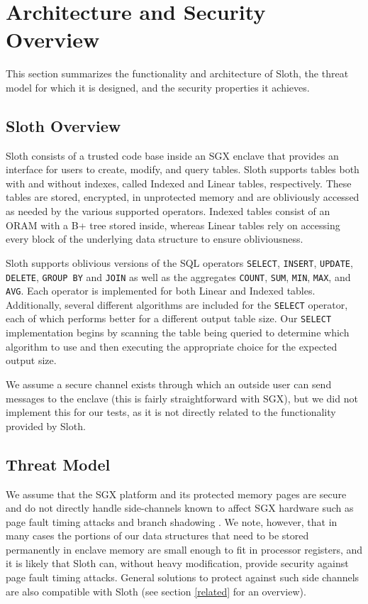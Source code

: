 \documentclass[USenglish,oneside,twocolumn]{article}
\def\name/{Sloth}
\begin{document}
\section{Architecture and Security Overview}\label{model}
This section summarizes the functionality and architecture of \name/, the threat model for which it is designed, and the security properties it achieves. 

\subsection{\name/ Overview}
\name/ consists of a trusted code base inside an SGX enclave that provides an interface for users to create, modify, and query tables. \name/ supports tables both with and without indexes, called Indexed and Linear tables, respectively. These tables are stored, encrypted, in unprotected memory and are obliviously accessed as needed by the various supported operators. Indexed tables consist of an ORAM with a B+ tree stored inside, whereas Linear tables rely on accessing every block of the underlying data structure to ensure obliviousness.

  \name/ supports oblivious versions of the SQL operators \texttt{SELECT}, \texttt{INSERT}, \texttt{UPDATE}, \texttt{DELETE}, \texttt{GROUP BY} and \texttt{JOIN} as well as the aggregates \texttt{COUNT}, \texttt{SUM}, \texttt{MIN}, \texttt{MAX}, and \texttt{AVG}. Each operator is implemented for both Linear and Indexed tables. Additionally, several different algorithms are included for the \texttt{SELECT} operator, each of which performs better for a different output table size. Our \texttt{SELECT} implementation begins by scanning the table being queried to determine which algorithm to use and then executing the appropriate choice for the expected output size. 
  
We assume a secure channel exists through which an outside user can send messages to the enclave (this is fairly straightforward with SGX), but we did not implement this for our tests, as it is not directly related to the functionality provided by \name/.

\subsection{Threat Model}
We assume that the SGX platform and its protected memory pages are secure and do not directly handle side-channels known to affect SGX hardware such as page fault timing attacks \cite{XCP15} and branch shadowing \cite{LSG+16}. We note, however, that in many cases the portions of our data structures that need to be stored permanently in enclave memory are small enough to fit in processor registers, and it is likely that \name/ can, without heavy modification, provide security against page fault timing attacks. General solutions to protect against such side channels are also compatible with \name/ (see section \ref{related} for an overview). 
\end{document}
